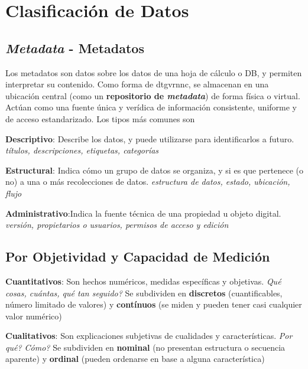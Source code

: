 \section{Clasificación de Datos}

\subsection{\textit{Metadata} - Metadatos}
Los metadatos son datos sobre los datos de una hoja de cálculo o DB, y permiten interpretar su contenido. Como forma de \gls{dtgvrnnc}, se almacenan en una ubicación central (como un \textbf{repositorio de \textit{metadata}}) de forma física o virtual. Actúan como una fuente única y verídica de información consistente, uniforme y de acceso estandarizado. Los tipos más comunes son
\begin{description}
        \item {\textbf{Descriptivo}: Describe los datos, y puede utilizarse para identificarlos a futuro. \textit{títulos, descripciones, etiquetas, categorías}}
        \item {\textbf{Estructural}: Indica cómo un grupo de datos se organiza, y si es que pertenece (o no) a una o más recolecciones de datos. \textit{estructura de datos, estado, ubicación, flujo}}
        \item {\textbf{Administrativo}:Indica la fuente técnica de una propiedad u objeto digital. \textit{versión, propietarios o usuarios, permisos de acceso y edición}}
\end{description}

\subsection{Por Objetividad y Capacidad de Medición}
\begin{description}
    \item{\textbf{Cuantitativos}: Son hechos numéricos, medidas específicas y objetivas. \textit{Qué cosas, cuántas, qué tan seguido?} Se subdividen en \textbf{discretos} (cuantificables, número limitado de valores) y \textbf{contínuos} (se miden y pueden tener casi cualquier valor numérico)}
    \item{\textbf{Cualitativos}: Son explicaciones subjetivas de cualidades y características. \textit{Por qué? Cómo?} Se subdividen en \textbf{nominal} (no presentan estructura o secuencia aparente) y \textbf{ordinal} (pueden ordenarse en base a alguna característica)}
\end{description}

